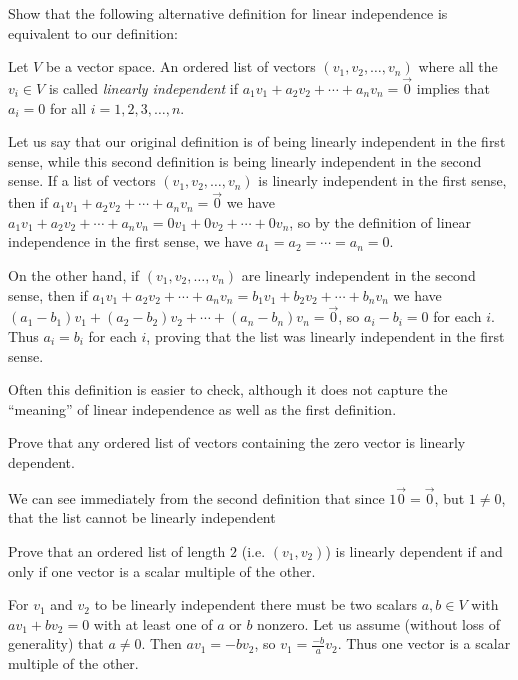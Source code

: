 \documentclass{ximera}
\begin{document}
 
 Show that the following alternative definition for linear independence is equivalent to our definition:
 	
 \begin{definition}
   Let $V$ be a vector space. An ordered list of vectors $(v_1,v_2,\ldots,v_n)$ where all the $v_i \in V$ is called \textit{linearly independent} if
   $a_1v_1+a_2v_2 + \cdots +a_nv_n = \vec{0}$ implies that $a_i = 0 $ for all $i=1,2,3,\ldots,n$.
 \end{definition}
 	
 
 \begin{free-response}
   Let us say that our original definition is of  being linearly independent in the first sense, while this second definition is being linearly independent 
   in the second sense.  If a list of vectors $(v_1,v_2,\ldots,v_n)$ is linearly independent in the first sense, then if $a_1v_1+a_2v_2 + \cdots +a_nv_n = \vec{0}$ we have
   $a_1v_1+a_2v_2 + \cdots +a_nv_n = 0v_1+0v_2+ \cdots +0v_n$, so by the definition of linear independence in the first sense, we have $a_1=a_2= \cdots =a_n=0$.
   
   On the other hand, if $(v_1,v_2,\ldots,v_n)$ are linearly independent in the second sense, then if $a_1v_1+a_2v_2 + \cdots +a_nv_n = b_1v_1 + b_2v_2 + \cdots + b_nv_n$ we have
   $(a_1-b_1)v_1+(a_2-b_2)v_2+\cdots+(a_n-b_n)v_n = \vec{0}$, so $a_i-b_i=0$ for each $i$.  Thus $a_i=b_i$ for each $i$, proving that the list was linearly independent 
   in the first sense.
 \end{free-response}
 
  	Often this definition is easier to check, although it does not capture the ``meaning'' of linear independence as well as the first definition.

 
 	Prove that any ordered list of vectors containing the zero vector is linearly dependent. 
	\begin{free-response}
		We can see immediately from the second definition that since $1\vec{0} = \vec{0}$, but $1\neq 0$, that the list cannot be linearly independent
	\end{free-response}
 
 	Prove that an ordered list of length $2$ (i.e. $(v_1,v_2)$) is linearly dependent if and only if one vector is a scalar multiple of the other.
	\begin{free-response}
		For $v_1$ and $v_2$ to be linearly independent there must be two scalars $a,b \in V$ with $av_1+bv_2=0$ with at least one of $a$ or $b$ nonzero.
		Let us assume (without loss of generality) that $a \neq 0$.  Then $av_1=-bv_2$, so $v_1=\frac{-b}{a}v_2$.  Thus one vector is a scalar multiple of the other.	
	
		\end{free-response}
\end{document}
